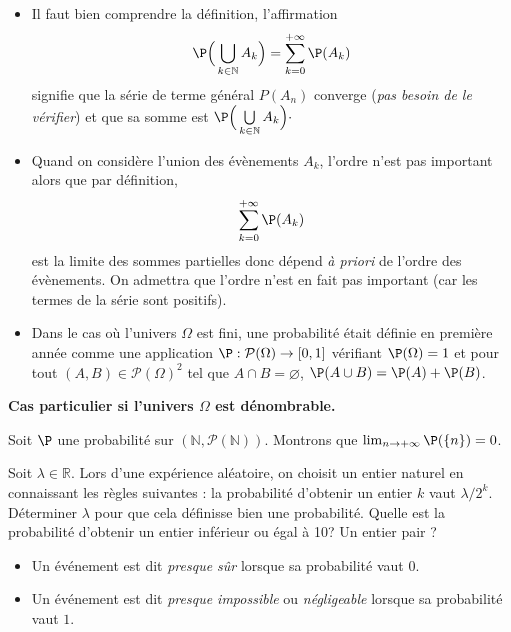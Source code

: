 \documentclass[a4paper,10pt]{report}
\begin{document}
\begin{enumerate}
\begin{Remarques}{}
\begin{itemize} 
\item Il faut bien comprendre  la définition, l'affirmation 
\[  \P\Big(\bigcup\limits_{k\in \mathbb N} A_k\Big) = \sum\limits_{k=0}^{+\infty } \P(A_k) \]
signifie que la série de terme général $P(A_n)$ converge (\emph{pas besoin de le vérifier}) et que sa somme est $\P\Big(\bigcup\limits_{k\in \mathbb N} A_k\Big) \cdot$
\item Quand on considère l'union des évènements $A_k$, l'ordre n'est pas important alors que par définition,
$$ \sum\limits_{k=0}^{+\infty } \P(A_k)$$
est la limite des sommes partielles donc dépend \emph{à priori} de l'ordre des évènements. On admettra que l'ordre n'est en fait pas important (car les termes de la série sont positifs).
\item Dans le cas où l'univers $\Omega$ est fini, une probabilité était définie en première année comme une application $\P : \mathcal{P}(\Omega) \rightarrow [0,1]$ vérifiant $\P(\Omega)=1$ et pour tout $(A,B) \in \mathcal{P}(\Omega)^2$ tel que $A \cap B=\varnothing$, $\P(A \cup B)=\P(A)+\P(B)$.
\end{itemize}
\end{Remarques}{}

\medskip

\textbf{Cas particulier si l'univers $\Omega$ est dénombrable.}

\medskip

\vspace{9cm}

\begin{Exemple} Soit $\P$ une probabilité sur $(\mathbb{N}, \mathcal{P}(\mathbb{N}))$. Montrons que $\lim_{n \rightarrow + \infty} \P( \lbrace n \rbrace )= 0$.
 \newpage
\end{Exemple}
\begin{ApplicationDirecte}
Soit $\lambda \in \mathbb{R}$. Lors d'une expérience aléatoire, on choisit un entier naturel en connaissant les règles suivantes : la probabilité d'obtenir un entier $k$ vaut $ \lambda/2^k$. Déterminer $\lambda$ pour que cela définisse bien une probabilité. Quelle est la probabilité d'obtenir un entier inférieur ou égal à 10? Un entier pair ?
\end{ApplicationDirecte}

\begin{Definition}{}
\begin{itemize}
\item Un événement est dit \emph{presque sûr} lorsque sa probabilité vaut $0$.
\item Un événement est dit \emph{presque impossible} ou \emph{négligeable} lorsque sa probabilité vaut $1$.
\end{itemize}
\end{Definition}



\end{enumerate}
\end{document}
